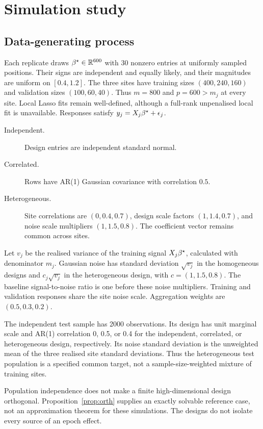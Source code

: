 \section{Simulation study}
\label{sec:sim}

\subsection{Data-generating process}

Each replicate draws $\beta^\star\in\mathbb{R}^{600}$ with 30 nonzero entries
at uniformly sampled positions. Their signs are independent and equally
likely, and their magnitudes are uniform on $[0.4,1.2]$. The three sites
have training sizes $(400,240,160)$ and validation sizes $(100,60,40)$.
Thus $m=800$ and $p=600>m_j$ at every site. Local Lasso fits remain
well-defined, although a full-rank unpenalised local fit is unavailable.
Responses satisfy $y_j=X_j\beta^\star+\epsilon_j$.

\begin{description}
\item[Independent.] Design entries are independent standard normal.
\item[Correlated.] Rows have AR(1) Gaussian covariance with correlation $0.5$.
\item[Heterogeneous.] Site correlations are $(0,0.4,0.7)$, design scale
 factors $(1,1.4,0.7)$, and noise scale multipliers $(1,1.5,0.8)$.
 The coefficient vector remains common across sites.
\end{description}

Let $v_j$ be the realised variance of the training signal
$X_j\beta^\star$, calculated with denominator $m_j$. Gaussian noise has
standard deviation $\sqrt{v_j}$ in the homogeneous designs and
$c_j\sqrt{v_j}$ in the heterogeneous design, with $c=(1,1.5,0.8)$.
The baseline signal-to-noise ratio is one before these noise multipliers.
Training and validation responses share the site noise scale.
Aggregation weights are $(0.5,0.3,0.2)$.

The independent test sample has 2000 observations. Its design has unit
marginal scale and AR(1) correlation 0, 0.5, or 0.4 for the independent,
correlated, or heterogeneous design, respectively. Its noise standard
deviation is the unweighted mean of the three realised site standard
deviations. Thus the heterogeneous test population is a specified common
target, not a sample-size-weighted mixture of training sites.

Population independence does not make a finite high-dimensional design
orthogonal. Proposition~\ref{prop:orth} supplies an exactly solvable
reference case, not an approximation theorem for these simulations.
The designs do not isolate every source of an epoch effect.

